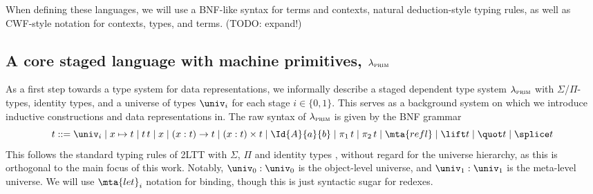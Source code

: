 When defining these languages, we will use a BNF-like syntax for terms and
contexts, natural deduction-style typing rules, as well as CWF-style notation
for contexts, types, and terms. (TODO: expand!)

\subsection{A core staged language with machine primitives, $\lambda_{\textsc{prim}}$}
\newcommand{\seq}[2]{[#1; #2]}

As a first step towards a type system for data representations, we informally
describe a staged dependent type system $\lambda_{\textsc{prim}}$ with
$\Sigma$/$\Pi$-types, identity types, and a universe of types $\univ_i$ for
each stage $i \in \{0, 1\}$. This serves as a background system on which we
introduce inductive constructions and data representations in. The raw syntax
of $\lambda_{\textsc{prim}}$ is given by the BNF grammar
\[
  t ::= \univ_i \mid x \mapsto t \mid t \, t \mid x \mid (x : t) \to t \mid (x : t) \times t \mid
  \Id{A}{a}{b} \mid \pi_1 \, t \mid \pi_2 \, t \mid \mta{refl} \mid \lift t \mid \quot t \mid \splice t
\]
This follows the standard typing rules of 2LTT with $\Sigma$, $\Pi$ and
identity types \cite{Kovacs2022-vb}, without regard for the universe hierarchy,
as this is orthogonal to the main focus of this work. Notably, $\univ_0 :
  \univ_0$ is the object-level universe, and $\univ_1 : \univ_1$ is the
meta-level universe. We will use $\mta{let}_i$ notation for binding, though
this is just syntactic sugar for redexes.

